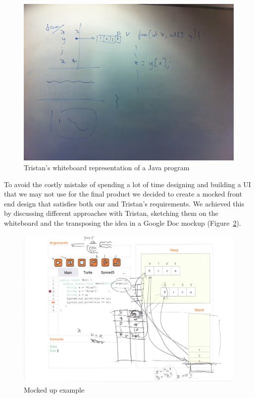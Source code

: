 \documentclass[11pt, a4paper]{article}
\begin{document}
\begin{figure}[h!]
\centering
\includegraphics[width=\textwidth]{sketch.jpg}
\caption{Tristan's whiteboard representation of a Java program}
\label{fig:sketch}
\end{figure}

To avoid the costly mistake of spending a lot of time designing and building a UI that we may not use for the final product we decided to create a mocked front end design that satisfies both our and Tristan's requirements. We achieved this by discussing different approaches with Tristan, sketching them on the whiteboard and the transposing the idea in a Google Doc mockup (Figure~\ref{fig:mockup}).

\begin{figure}[h!]
\centering
\includegraphics[width=\textwidth]{mockup.png}
\caption{Mocked up example}
\label{fig:mockup}
\end{figure}
\end{document}
